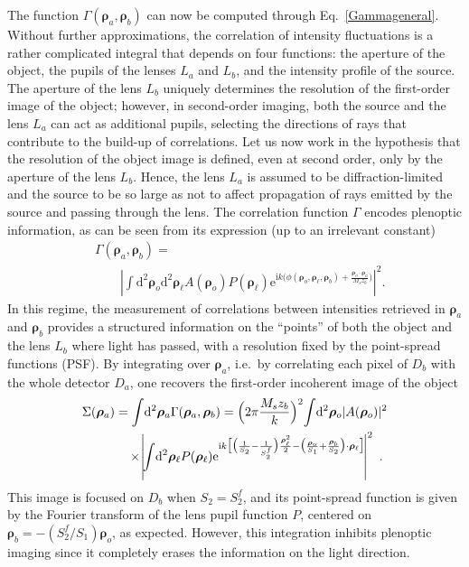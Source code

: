 \documentclass[aps,pra,amssymb,twocolumn,amsmath,superscriptaddress,showpacs,10pt]{revtex4-1}
\def\e{\mathrm{e}}
\def\d{\mathrm{d}}
\def\i{\mathrm{i}}
\begin{document}
The function $\Gamma(\bm{\rho}_a,\bm{\rho}_b)$ can now be computed through Eq.~\eqref{Gammageneral}. Without further approximations, the correlation of intensity fluctuations is a rather complicated integral that depends on four functions: the aperture of the object, the pupils of the lenses $L_a$ and $L_b$, and the intensity profile of the source. The aperture of the lens $L_b$ uniquely determines the resolution of the first-order image of the object; however, in second-order imaging, both the source and the lens $L_a$ can act as additional pupils, selecting the directions of rays that contribute to the build-up of correlations. Let us now work in the hypothesis that the resolution of the object image is defined, even at second order, only by the aperture of the lens $L_b$. Hence, the lens $L_a$ is assumed to be diffraction-limited and the source to be so large as not to affect propagation of rays emitted by the source and passing through the lens. The correlation function $\Gamma$ encodes plenoptic information, as can be seen from its expression (up to an irrelevant constant)
\begin{align}\label{Gammafirst}
& \Gamma(\bm{\rho}_a,\bm{\rho}_b) = \nonumber \\ & \qquad \left| \!\int\!\d^2\bm{\rho}_o\d^2\bm{\rho}_{\ell} A(\bm{\rho}_o) P (\bm{\rho}_{\ell}) \e^{\i k \bigl( \phi(\bm{\rho}_o,\bm{\rho}_{\ell},\bm{\rho}_b) + \frac{\bm{\rho}_o\cdot\bm{\rho}_a}{M_s z_b} \bigr) } \right|^2 .
\end{align}
In this regime, the measurement of correlations between intensities retrieved in $\bm{\rho}_a$ and $\bm{\rho}_b$ provides a structured information on the ``points'' of both the object and the lens $L_b$ where light has passed, with a resolution fixed by the point-spread functions (PSF).
By integrating over $\bm{\rho}_a$, i.e.~by correlating each pixel of $D_b$ with the whole detector $D_a$, one recovers the first-order incoherent image of the object
\begin{align}\label{ghostfirst}
\Sigma(\bm{\rho}_a)&=\int\!\d^2\bm{\rho}_a \Gamma(\bm{\rho}_a,\bm{\rho}_b) = \Bigl(2\pi \frac{M_s z_b}{k}\Bigr)^2 \!\int\!\d^2\bm{\rho}_o |A(\bm{\rho}_o)|^2 \nonumber \\
& \quad \times \!\left|\!\int\!\d^2\bm{\rho}_{\ell} P(\bm{\rho}_{\ell}) \e^{\i k \bigl[ \bigl( \frac{1}{S_2} - \frac{1}{S_2^f} \bigr) \frac{\bm{\rho}_{\ell}^2}{2} - \bigl( \frac{\bm{\rho}_o}{S_1} + \frac{\bm{\rho}_b}{S_2}\bigr)\cdot \bm{\rho}_{\ell} \bigr] }\!\right|^2 \ .
\end{align}
This image is focused on $D_b$ when $S_2=S_2^f$, and its point-spread function is given by the Fourier transform of the lens pupil function $P$, centered on $\bm{\rho}_{b}=-(S_2^f/S_1)\bm{\rho}_o$, as expected. However, this integration inhibits plenoptic imaging since it completely erases the information on the light direction. 
\end{document}
